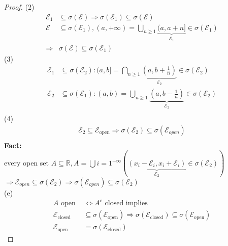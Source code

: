  \begin{proof}
    (2)\begin{align*}{}{}
    \mathcal{E}_1&\subseteq \sigma(\mathcal{E}) \Rightarrow \sigma(\mathcal{E}_1)\subseteq \sigma(\mathcal{E})\\
    \mathcal{E}&\subseteq \sigma(\mathcal{E}_1),(a,+\infty)=\bigcup_{n\geq1}\underbrace{(a,a+n]}_{\mathcal{E}_1}\in \sigma(\mathcal{E}_1)\\
    \Rightarrow &\sigma(\mathcal{E})\subseteq \sigma(\mathcal{E}_1)
    \end{align*}
    (3)\begin{align*}{}{}
        \mathcal{E}_1&\subseteq \sigma(\mathcal{E}_2): (a,b]=\bigcap_{n\geq1}\underbrace{(a,b+\frac{1}{n})}_{\mathcal{E}_2}\in \sigma(\mathcal{E}_2)\\
        \mathcal{E}_2&\subseteq \sigma(\mathcal{E}_1): (a,b)=\bigcup_{n\geq1}\underbrace{(a,b-\frac{1}{n})}_{\mathcal{E}_2}\in \sigma(\mathcal{E}_2)\\
    \end{align*}
    (4)\begin{align*}{}{}
    \mathcal{E}_2\subseteq \mathcal{E}_{\text{open}}\Rightarrow \sigma(\mathcal{E}_2)\subseteq \sigma(\mathcal{E}_{open})\\
    \end{align*}
    \textbf{Fact:}
    \\ every open set $ A\subseteq \mathbb{R},A=\bigcup{i=1}^{+\infty}(\underbrace{(x_i-\mathcal{E}_i,x_i+\mathcal{E}_i)}_{\mathcal{E}_2}\in\sigma(\mathcal{E}_2)) $ 
    \\$ \Rightarrow \mathcal{E}_{open}\subseteq \sigma(\mathcal{E}_2)\Rightarrow \sigma(\mathcal{E}_{open})\subseteq \sigma(\mathcal{E}_2) $ \\
    (e)\\
    \begin{align*}{}{}
    A \text{ open } &\Leftrightarrow A^c \text{ closed implies }\\
    \mathcal{E}_{\text{closed}}&\subseteq \sigma(\mathcal{E}_{\text{open}})\Rightarrow \sigma(\mathcal{E}_{\text{closed}})\subseteq \sigma(\mathcal{E}_{\text{open}})\\
    \mathcal{E}_{\text{open}}&= \sigma(\mathcal{E}_{\text{closed}})
    \end{align*}
 \end{proof}

